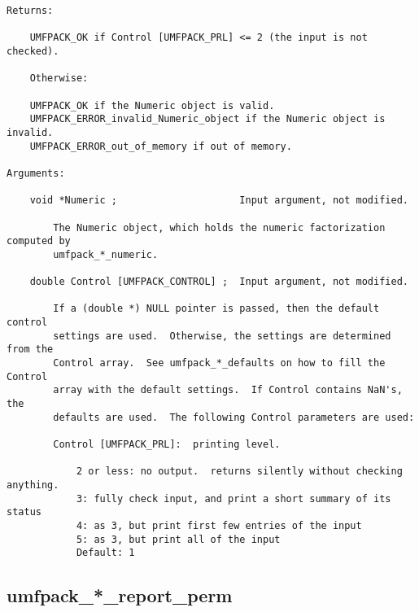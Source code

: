 {\begin{verbatim}
Returns:

    UMFPACK_OK if Control [UMFPACK_PRL] <= 2 (the input is not checked).

    Otherwise:

    UMFPACK_OK if the Numeric object is valid.
    UMFPACK_ERROR_invalid_Numeric_object if the Numeric object is invalid.
    UMFPACK_ERROR_out_of_memory if out of memory.

Arguments:

    void *Numeric ;                     Input argument, not modified.

        The Numeric object, which holds the numeric factorization computed by
        umfpack_*_numeric.

    double Control [UMFPACK_CONTROL] ;  Input argument, not modified.

        If a (double *) NULL pointer is passed, then the default control
        settings are used.  Otherwise, the settings are determined from the
        Control array.  See umfpack_*_defaults on how to fill the Control
        array with the default settings.  If Control contains NaN's, the
        defaults are used.  The following Control parameters are used:

        Control [UMFPACK_PRL]:  printing level.

            2 or less: no output.  returns silently without checking anything.
            3: fully check input, and print a short summary of its status
            4: as 3, but print first few entries of the input
            5: as 3, but print all of the input
            Default: 1
\end{verbatim}
}

\newpage
\subsection{umfpack\_*\_report\_perm}

